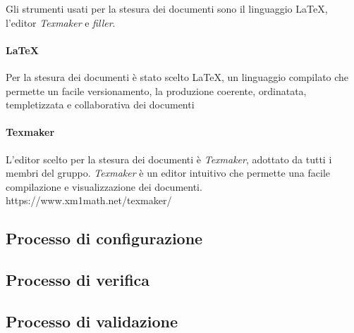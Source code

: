 Gli strumenti usati per la stesura dei documenti sono il linguaggio \LaTeX, l'editor \textit{Texmaker} e \textit{filler}.

\paragraph{\LaTeX}

Per la stesura dei documenti è stato scelto \LaTeX, un linguaggio compilato che permette un facile versionamento, la produzione coerente, ordinatata, templetizzata e collaborativa dei documenti

\paragraph{Texmaker}

L'editor scelto per la stesura dei documenti è \textit{Texmaker}, adottato da tutti i membri del gruppo. \textit{Texmaker} è un editor intuitivo che permette una facile compilazione e visualizzazione dei documenti.\newline
https://www.xm1math.net/texmaker/

\subsection{Processo di configurazione}

\subsection{Processo di verifica}

\subsection{Processo di validazione}
